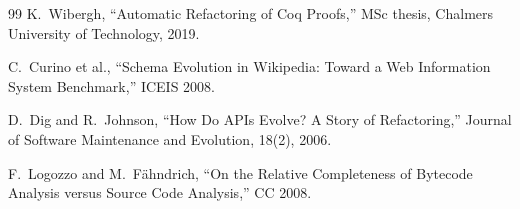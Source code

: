 \documentclass[11pt]{article}
\begin{document}
\begin{thebibliography}{99}
K.~Wibergh, ``Automatic Refactoring of Coq Proofs,'' MSc thesis,
Chalmers University of Technology, 2019.

C.~Curino et al., ``Schema Evolution in Wikipedia: Toward a Web
Information System Benchmark,'' ICEIS 2008.

D.~Dig and R.~Johnson, ``How Do APIs Evolve? A Story of Refactoring,''
Journal of Software Maintenance and Evolution, 18(2), 2006.

F.~Logozzo and M.~Fähndrich, ``On the Relative Completeness of
Bytecode Analysis versus Source Code Analysis,'' CC 2008.

\end{thebibliography}
\end{document}
